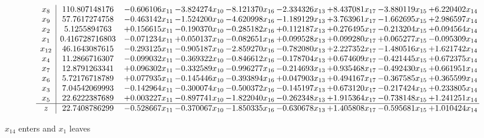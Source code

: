 \documentclass[10pt]{article}
\begin{document}
 \[\begin{array}{c| c c@{\hskip 2pt} c@{\hskip 2pt} c@{\hskip 2pt} c@{\hskip 2pt} c@{\hskip 2pt} c@{\hskip 2pt} c@{\hskip 2pt} }
 x_{8}   &  110.807148176 & -0.606106 x_{11} & -3.824274 x_{10} & -8.121370 x_{16} & -2.334326 x_{13} & + 8.437081 x_{17} & -3.880119 x_{15} & + 6.220402 x_{14}\\
 x_{9}   &  57.7617274758 & -0.463142 x_{11} & -1.524200 x_{10} & -4.620998 x_{16} & -1.189129 x_{13} & + 3.763961 x_{17} & -1.662695 x_{15} & + 2.986597 x_{14}\\
 x_{2}   &  5.1255894763 & + 0.156615 x_{11} & -0.190370 x_{10} & -0.285182 x_{16} & + 0.112187 x_{13} & + 0.276495 x_{17} & -0.213204 x_{15} & + 0.094564 x_{14}\\
 x_{1}   &  0.416728716803 & -0.071234 x_{11} & + 0.050137 x_{10} & -0.082651 x_{16} & + 0.099528 x_{13} & + 0.099280 x_{17} & + 0.065277 x_{15} & -0.095309 x_{14}\\
 x_{12}   &  46.1643087615 & -0.293125 x_{11} & -0.905187 x_{10} & -2.859270 x_{16} & -0.782080 x_{13} & + 2.227352 x_{17} & -1.480516 x_{15} & + 1.621742 x_{14}\\
 x_{4}   &  11.2866716307 & -0.099032 x_{11} & -0.369322 x_{10} & -0.846612 x_{16} & -0.178704 x_{13} & + 0.674609 x_{17} & -0.421445 x_{15} & + 0.672375 x_{14}\\
 x_{7}   &  12.8791263341 & + 0.096302 x_{11} & -0.332589 x_{10} & -0.996277 x_{16} & -0.214693 x_{13} & + 0.935468 x_{17} & -0.492430 x_{15} & + 0.661951 x_{14}\\
 x_{6}   &  5.72176718789 & + 0.077935 x_{11} & -0.145446 x_{10} & -0.393894 x_{16} & + 0.047903 x_{13} & + 0.494167 x_{17} & -0.367585 x_{15} & + 0.365599 x_{14}\\
 x_{3}   &  7.04542069993 & -0.142964 x_{11} & -0.300074 x_{10} & -0.500372 x_{16} & -0.145197 x_{13} & + 0.673120 x_{17} & -0.217424 x_{15} & + 0.233805 x_{14}\\
 x_{5}   &  22.6222387689 & + 0.003227 x_{11} & -0.897741 x_{10} & -1.822040 x_{16} & -0.262348 x_{13} & + 1.915364 x_{17} & -0.738148 x_{15} & + 1.241251 x_{14}\\
\hline
z    &  22.7408786299 & -0.528667 x_{11} & -0.370067 x_{10} & -1.850335 x_{16} & -0.630678 x_{13} & + 1.405808 x_{17} & -0.595681 x_{15} & + 1.010424 x_{14}\\
\end{array}\]


 $ x_{14} $ enters and $ x_{1} $ leaves 
\end{document}
